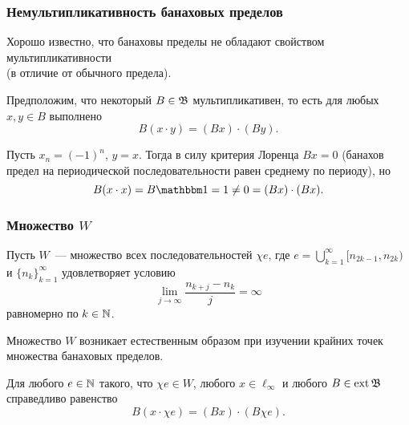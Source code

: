 \begin{frame}\frametitle{Немультипликативность банаховых пределов}
	Хорошо известно,
	что банаховы пределы не обладают свойством мультипликативности
	\\
	(в отличие от обычного предела).

	Предположим, что некоторый $B\in \mathfrak{B}$ мультипликативен,
	то есть для любых $x,y\in B$ выполнено
	\begin{equation}
		B(x\cdot y) = (Bx)\cdot (By)
		.
	\end{equation}

	Пусть $x_n = (-1)^n$, $y=x$.
	Тогда в силу критерия Лоренца $Bx = 0$
	(банахов предел на периодической последовательности равен среднему по периоду),
	но
	\begin{equation}
		B(x\cdot x) = B\one = 1 \ne 0 = (Bx) \cdot (Bx)
		.
	\end{equation}


\end{frame}


\begin{frame}\frametitle{Множество $W$}


	Пусть $W$~--- множество всех последовательностей $\chi e$, где $e =\bigcup_{k=1}^{\infty} [n_{2k-1}, n_{2k} )$
	и $\{n_k \}_{k=1}^{\infty}$
	удовлетворяет условию
	\begin{equation}
		\label{eq:lim_j_n_kj_measure}
		\lim_{j\to\infty}\frac{n_{k+j} - n_k}{j} = \infty
	\end{equation}
	равномерно по $k \in \mathbb{N}$.

	\vfill

	Множество $W$ возникает естественным образом при изучении крайних точек множества банаховых пределов.

	\begin{llemma}
		Для любого $e\in\mathbb{N}$ такого, что $\chi e \in W$,
		любого $x\in\ell_\infty$
		и любого $B\in\operatorname{ext}\mathfrak{B}$
		справедливо равенство
		\begin{equation}
			B(x \cdot \chi e) = (Bx) \cdot (B\chi e)
			.
		\end{equation}
	\end{llemma}
\end{frame}




